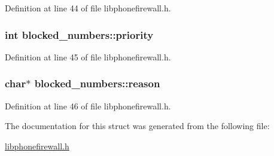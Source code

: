 Definition at line 44 of file libphonefirewall.h.\hypertarget{structblocked__numbers_e04cea5a63d4e5e1488dab84c7e28a4b}{
\subsubsection{\setlength{\rightskip}{0pt plus 5cm}int {\bf blocked\_\-numbers::priority}}}
\label{structblocked__numbers_e04cea5a63d4e5e1488dab84c7e28a4b}




Definition at line 45 of file libphonefirewall.h.\hypertarget{structblocked__numbers_9106d81a8838700a8a335026b1ac1c55}{
\subsubsection{\setlength{\rightskip}{0pt plus 5cm}char$\ast$ {\bf blocked\_\-numbers::reason}}}
\label{structblocked__numbers_9106d81a8838700a8a335026b1ac1c55}




Definition at line 46 of file libphonefirewall.h.

The documentation for this struct was generated from the following file:\begin{CompactItemize}
\item 
\hyperlink{libphonefirewall_8h}{libphonefirewall.h}\end{CompactItemize}
